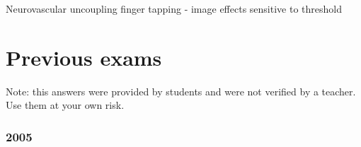 \documentclass[12pt,article,oneside,a4paper]{memoir}
\begin{document}
Neurovascular uncoupling
finger tapping - image effects
sensitive to threshold

\newpage
\section{Previous exams}

Note: this answers were provided by students and were not verified by a teacher. Use them at your own risk.

\subsubsection{2005}
\end{document}
